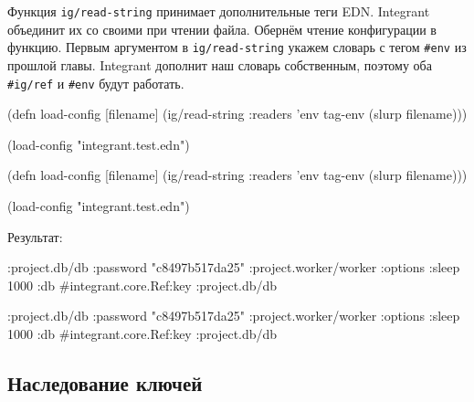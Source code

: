 \fi

Функция \verb|ig/read-string| принимает дополнительные теги EDN. Integrant
объединит их со своими при чтении файла. Обернём чтение конфигурации в
функцию. Первым аргументом в \verb|ig/read-string| укажем словарь с тегом
\verb|#env| из прошлой главы. Integrant дополнит наш словарь собственным,
поэтому оба \verb|#ig/ref| и \verb|#env| будут работать.

\ifx\DEVICETYPE\MOBILE

\begin{english}
  \begin{clojure}
(defn load-config [filename]
  (ig/read-string
    {:readers {'env tag-env}}
    (slurp filename)))

(load-config "integrant.test.edn")
  \end{clojure}
\end{english}

\else

\begin{english}
  \begin{clojure}
(defn load-config [filename]
  (ig/read-string {:readers {'env tag-env}}
                  (slurp filename)))

(load-config "integrant.test.edn")
  \end{clojure}
\end{english}

\fi

\noindent
Результат:

\ifx\DEVICETYPE\MOBILE

\begin{english}
  \begin{clojure}
{:project.db/db
 {:password "c8497b517da25"}
 :project.worker/worker
 {:options {:sleep 1000}
  :db
  #integrant.core.Ref{:key
                      :project.db/db}}}
  \end{clojure}
\end{english}

\else

\begin{english}
  \begin{clojure}
{:project.db/db {:password "c8497b517da25"}
 :project.worker/worker
 {:options {:sleep 1000}
  :db #integrant.core.Ref{:key :project.db/db}}}
  \end{clojure}
\end{english}

\fi

\subsection{Наследование ключей}

